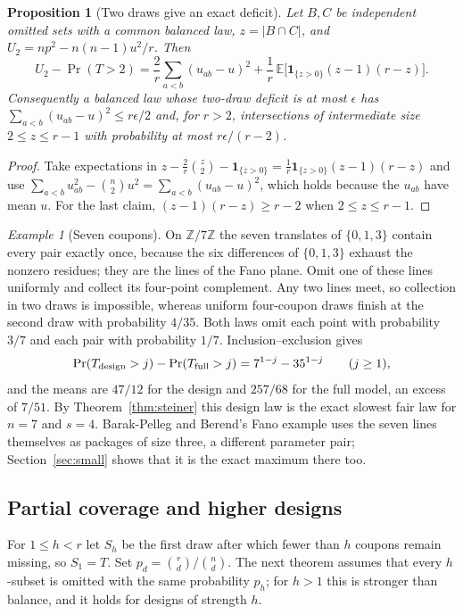 \documentclass[11pt,a4paper]{article}
\newtheorem{proposition}[theorem]{Proposition}
\theoremstyle{remark}
\newtheorem{example}[theorem]{Example}
\newcommand{\E}{\mathbb E}
\newcommand{\ind}{\mathbf 1}
\begin{document}
\begin{proposition}[Two draws give an exact deficit]\label{prop:deficit}
Let $B,C$ be independent omitted sets with a common balanced law, $z=|B\cap C|$, and $U_2=np^2-n(n-1)u^2/r$. Then
\[
 U_2-\Pr(T>2)=\frac2r\sum_{a<b}(u_{ab}-u)^2+\frac1r\,\E\big[\ind_{\{z>0\}}(z-1)(r-z)\big].
\]
Consequently a balanced law whose two-draw deficit is at most $\epsilon$ has $\sum_{a<b}(u_{ab}-u)^2\le r\epsilon/2$ and, for $r>2$, intersections of intermediate size $2\le z\le r-1$ with probability at most $r\epsilon/(r-2)$.
\end{proposition}

\begin{proof}
Take expectations in $z-\frac2r\binom z2-\ind_{\{z>0\}}=\frac1r\ind_{\{z>0\}}(z-1)(r-z)$ and use $\sum_{a<b}u_{ab}^2-\binom n2u^2=\sum_{a<b}(u_{ab}-u)^2$, which holds because the $u_{ab}$ have mean $u$. For the last claim, $(z-1)(r-z)\ge r-2$ when $2\le z\le r-1$.
\end{proof}

\begin{example}[Seven coupons]\label{ex:seven}
On $\mathbb Z/7\mathbb Z$ the seven translates of $\{0,1,3\}$ contain every pair exactly once, because the six differences of $\{0,1,3\}$ exhaust the nonzero residues; they are the lines of the Fano plane. Omit one of these lines uniformly and collect its four-point complement. Any two lines meet, so collection in two draws is impossible, whereas uniform four-coupon draws finish at the second draw with probability $4/35$. Both laws omit each point with probability $3/7$ and each pair with probability $1/7$. Inclusion--exclusion gives
\[
 \Pr(T_{\rm design}>j)-\Pr(T_{\rm full}>j)=7^{1-j}-35^{1-j}\qquad(j\ge1),
\]
and the means are $47/12$ for the design and $257/68$ for the full model, an excess of $7/51$. By Theorem~\ref{thm:steiner} this design law is the exact slowest fair law for $n=7$ and $s=4$. Barak-Pelleg and Berend's Fano example \cite{barak} uses the seven lines themselves as packages of size three, a different parameter pair; Section~\ref{sec:small} shows that it is the exact maximum there too.
\end{example}

\subsection*{Partial coverage and higher designs}
For $1\le h<r$ let $S_h$ be the first draw after which fewer than $h$ coupons remain missing, so $S_1=T$. Set $p_d=\binom rd/\binom nd$. The next theorem assumes that every $h$-subset is omitted with the same probability $p_h$; for $h>1$ this is stronger than balance, and it holds for designs of strength $h$.
\end{document}
